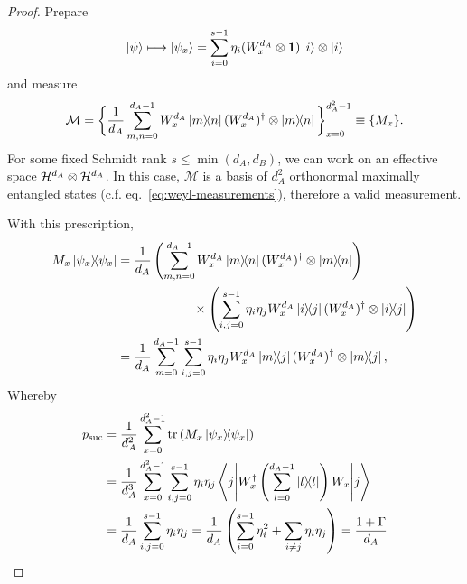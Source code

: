     \purestates*
    \begin{proof}
        Prepare
        $$
            \ket{\psi} \longmapsto \ket{\psi_{x}} = \sum_{i=0}^{s-1} \eta_i (W_x^{d_A} \otimes \mathbf{1}) \ket{i} \otimes \ket{i}
        $$
        and measure
        $$
            \mathcal{M} = \bigg\{ \frac{1}{d_A} \sum_{m,n=0}^{d_A - 1} W_x^{d_A} \ketbra{m}{n} (W_x^{d_A})^\dagger \otimes \ketbra{m}{n} \bigg\}_{x=0}^{d_A^2 - 1} \equiv \{ M_x \} .
        $$
        For some fixed Schmidt rank $s \leq \min(d_A, d_B)$, we can work on an effective space $\mathcal{H}^{d_A} \otimes \mathcal{H}^{d_A}$. In this case, $\mathcal{M}$ is a basis of $d_A^2$ orthonormal maximally entangled states (c.f. eq.~\eqref{eq:weyl-measurements}), therefore a valid measurement.
        
        With this prescription,
        \begin{align*}
            M_x \ketbra{\psi_x}{\psi_x} &= \frac{1}{d_A} \left( \sum_{m, n = 0}^{d_A - 1} W_x^{d_A} \ketbra{m}{n} (W_x^{d_A})^\dagger \otimes \ketbra{m}{n} \right) \\
            &\qquad\qquad\qquad\times\left( \sum_{i,j=0}^{s - 1} \eta_i \eta_j  W_x^{d_A} \ketbra{i}{j} (W_x^{d_A})^\dagger \otimes \ketbra{i}{j}\right) \\
            &= \frac{1}{d_A} \sum_{m = 0}^{d_A - 1} \sum_{i, j=0}^{s-1} \eta_i \eta_j W_x^{d_A} \ketbra{m}{j} (W_x^{d_A})^\dagger \otimes \ketbra{m}{j} ,
        \end{align*}
        Whereby
        \begin{align*}
            p_{\text{suc}} &= \frac{1}{d_A^2} \sum_{x=0}^{d_A^2 - 1} \text{tr}\left(  M_x \ketbra{\psi_x}{\psi_x}  \right) \\
            &= \frac{1}{d_A^3} \sum_{x=0}^{d_A^2-1} \sum_{i,j = 0}^{s-1} \eta_i \eta_j \left\langle j \middle\vert W_x^\dagger \left( \sum_{l=0}^{d_A - 1} \ketbra{l}{l} \right) W_x \middle\vert j \right\rangle \\
            &= \frac{1}{d_A} \sum_{i,j=0}^{s-1} \eta_i \eta_j = \frac{1}{d_A} \left( \sum_{i=0}^{s-1} \eta_i^2 + \sum_{i \neq j} \eta_i \eta_j \right) = \frac{1 + \Gamma}{d_A}
        \end{align*}
    \end{proof}


